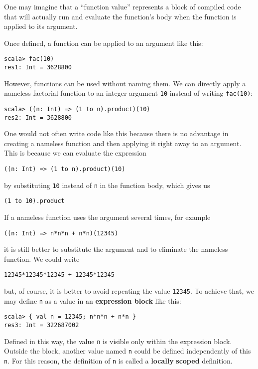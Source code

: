 One may imagine that a \textsf{``}function value\textsf{''} represents a block\emph{
}of compiled code that will actually run and evaluate the function\textsf{'}s
body when the function is applied to its argument.

Once defined, a function can be applied to an argument like this:
\begin{lstlisting}
scala> fac(10)
res1: Int = 3628800
\end{lstlisting}

However, functions can be used without naming them. We can directly
apply a nameless factorial function to an integer argument \lstinline!10!
instead of writing \lstinline!fac(10)!:
\begin{lstlisting}
scala> ((n: Int) => (1 to n).product)(10)
res2: Int = 3628800
\end{lstlisting}
One would not often write code like this because there is no advantage
in creating a nameless function and then applying it right away to
an argument. This is because we can evaluate the expression
\begin{lstlisting}
((n: Int) => (1 to n).product)(10)
\end{lstlisting}
by substituting \lstinline!10! instead of \lstinline!n! in the function
body, which gives us
\begin{lstlisting}
(1 to 10).product
\end{lstlisting}

If a nameless function uses the argument several times, for example
\begin{lstlisting}
((n: Int) => n*n*n + n*n)(12345)
\end{lstlisting}
it is still better to substitute the argument and to eliminate the
nameless function. We could write
\begin{lstlisting}
12345*12345*12345 + 12345*12345
\end{lstlisting}
but, of course, it is better to avoid repeating the value \lstinline!12345!.
To achieve that, we may define \texttt{}\lstinline!n! as a value
in an \textbf{expression block} like this:
\begin{lstlisting}
scala> { val n = 12345; n*n*n + n*n }
res3: Int = 322687002
\end{lstlisting}
Defined in this way, the value \lstinline!n! is visible only within
the expression block. Outside the block, another value named \lstinline!n!
could be defined independently of this \lstinline!n!. For this reason,
the definition of \lstinline!n! is called a \textbf{locally}
\textbf{scoped} definition.

